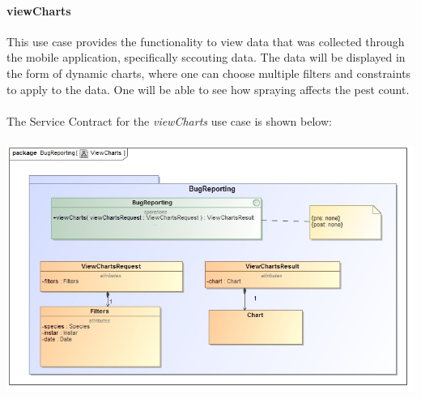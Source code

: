 \documentclass[11pt,a4paper,titlepage]{article}
\begin{document}
		\paragraph{viewCharts }
		This use case provides the functionality to view data that was collected through the mobile application, specifically sccouting data. The data will be displayed in the form of dynamic charts, where one can choose multiple filters and constraints to apply to the data. One will be able to see how spraying affects the pest count.\\\hfill\\
		The Service Contract for the \textit{viewCharts} use case is shown below:\\\hfill\\	
		\includegraphics[width=\linewidth]{viewCharts}	
		
\end{document}
